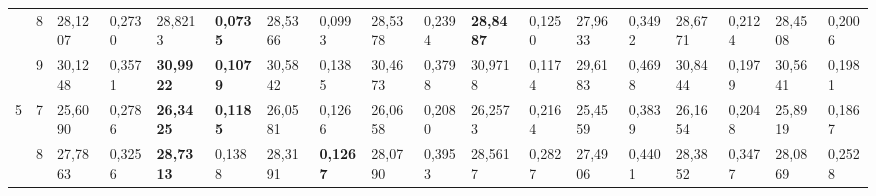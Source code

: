 \documentclass[conference]{IEEEtran}
\begin{document}
\begin{table*}[]
\begin{tabular}{|cc|ll|ll|ll|ll|ll|ll|ll|ll|}
		\multicolumn{1}{|c|}{}                    & 8          & \multicolumn{1}{l|}{28,1207}           & 0,2730                            & \multicolumn{1}{l|}{28,8213}           & \textbf{0,0735}                   & \multicolumn{1}{l|}{28,5366}           & 0,0993                            & \multicolumn{1}{l|}{28,5378}           & 0,2394                            & \multicolumn{1}{l|}{\textbf{28,8487}}  & 0,1250                            & \multicolumn{1}{l|}{27,9633}           & 0,3492                            & \multicolumn{1}{l|}{28,6771}           & 0,2124                            & \multicolumn{1}{l|}{28,4508}           & 0,2006                            \\ \cline{2-18} 
		\multicolumn{1}{|c|}{}                    & 9          & \multicolumn{1}{l|}{30,1248}           & 0,3571                            & \multicolumn{1}{l|}{\textbf{30,9922}}  & \textbf{0,1079}                   & \multicolumn{1}{l|}{30,5842}           & 0,1385                            & \multicolumn{1}{l|}{30,4673}           & 0,3798                            & \multicolumn{1}{l|}{30,9718}           & 0,1174                            & \multicolumn{1}{l|}{29,6183}           & 0,4698                            & \multicolumn{1}{l|}{30,8444}           & 0,1979                            & \multicolumn{1}{l|}{30,5641}           & 0,1981                            \\ \hline
		\multicolumn{1}{|c|}{\multirow{3}{*}{5}}  & 7          & \multicolumn{1}{l|}{25,6090}           & 0,2786                            & \multicolumn{1}{l|}{\textbf{26,3425}}  & \textbf{0,1185}                   & \multicolumn{1}{l|}{26,0581}           & 0,1266                            & \multicolumn{1}{l|}{26,0658}           & 0,2080                            & \multicolumn{1}{l|}{26,2573}           & 0,2164                            & \multicolumn{1}{l|}{25,4559}           & 0,3839                            & \multicolumn{1}{l|}{26,1654}           & 0,2048                            & \multicolumn{1}{l|}{25,8919}           & 0,1867                            \\ \cline{2-18} 
		\multicolumn{1}{|c|}{}                    & 8          & \multicolumn{1}{l|}{27,7863}           & 0,3256                            & \multicolumn{1}{l|}{\textbf{28,7313}}  & 0,1388                            & \multicolumn{1}{l|}{28,3191}           & \textbf{0,1267}                   & \multicolumn{1}{l|}{28,0790}           & 0,3953                            & \multicolumn{1}{l|}{28,5617}           & 0,2827                            & \multicolumn{1}{l|}{27,4906}           & 0,4401                            & \multicolumn{1}{l|}{28,3852}           & 0,3477                            & \multicolumn{1}{l|}{28,0869}           & 0,2528                            \\ \cline{2-18} 

\end{tabular}
\end{table*}
\end{document}
